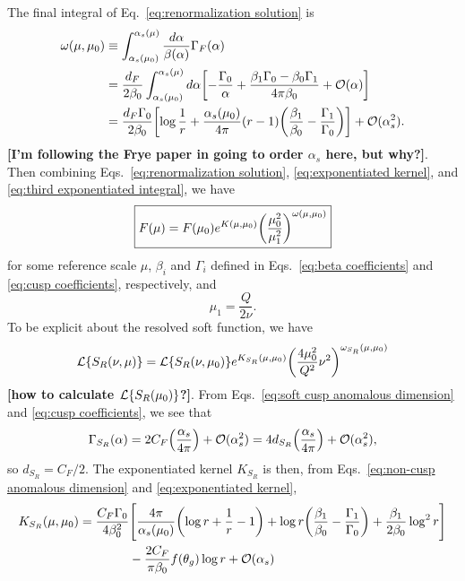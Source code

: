 \documentclass[11pt,twoside,reqno]{amsart}
\theoremstyle{plain}
\theoremstyle{remark}
\theoremstyle{definition}
\theoremstyle{remark}
\theoremstyle{definition}
\theoremstyle{definition}
\newcommand{\cL}{\mathcal{L}}
\newcommand{\cO}{\mathcal{O}}
\begin{document}
	The final integral of Eq.~\ref{eq:renormalization solution} is
	\begin{equation}\label{eq:third exponentiated integral}
	\begin{aligned}
		\omega(\mu, \mu_0) &\equiv \int_{\alpha_s(\mu_0)}^{\alpha_s(\mu)} \frac{d\alpha}{\beta(\alpha)}\Gamma_F(\alpha) \\
		&= \frac{d_F}{2\beta_0}\int_{\alpha_s(\mu_0)}^{\alpha_s(\mu)} d\alpha \qty[-\frac{\Gamma_0}{\alpha} + \frac{\beta_1\Gamma_0 - \beta_0 \Gamma_1}{4\pi \beta_0} + \cO(\alpha)] \\
		&= \frac{d_F \Gamma_0}{2\beta_0}\qty[\log \frac{1}{r} + \frac{\alpha_s(\mu_0)}{4\pi}(r - 1)\qty(\frac{\beta_1}{\beta_0} - \frac{\Gamma_1}{\Gamma_0})] + \cO(\alpha_s^2).
	\end{aligned}
	\end{equation}
	{\color{red}\textbf{[I'm following the Frye paper in going to order $\alpha_s$ here, but why?]}}. Then combining Eqs.~\ref{eq:renormalization solution}, \ref{eq:exponentiated kernel}, and \ref{eq:third exponentiated integral}, we have
	\begin{equation}
		\boxed{F(\mu) = F(\mu_0) e^{K(\mu, \mu_0)} \qty(\frac{\mu_0^2}{\mu_1^2})^{\omega(\mu, \mu_0)}}
	\end{equation}
	for some reference scale $\mu$, $\beta_i$ and $\Gamma_i$ defined in Eqs.~\ref{eq:beta coefficients} and \ref{eq:cusp coefficients}, respectively, and
	\begin{equation}
		\mu_1 = \frac{Q}{2\nu}.
	\end{equation}
	To be explicit about the resolved soft function, we have
	\begin{equation}\label{eq:resummed soft function laplace}
		\cL\qty{S_R(\nu, \mu)} = \cL\qty{S_R(\nu, \mu_0)} e^{K_{S_R}(\mu, \mu_0)} \qty(\frac{4 \mu_0^2}{Q^2}\nu^2)^{\omega_{S_R}(\mu, \mu_0)}
	\end{equation}
	{\color{red}\textbf{[how to calculate $\cL\qty{S_R(\mu_0)}$?]}}. From Eqs.~\ref{eq:soft cusp anomalous dimension} and \ref{eq:cusp coefficients}, we see that
	\begin{equation}
		\Gamma_{S_R}(\alpha) = 2C_F\qty(\frac{\alpha_s}{4\pi}) + \cO(\alpha_s^2) = 4d_{S_R} \qty(\frac{\alpha_s}{4\pi}) + \cO(\alpha_s^2),
	\end{equation}
	so $d_{S_R} = C_F/2$. The exponentiated kernel $K_{S_R}$ is then, from Eqs.~\ref{eq:non-cusp anomalous dimension} and \ref{eq:exponentiated kernel},
	\begin{equation}
	\begin{aligned}
		K_{S_R}(\mu, \mu_0) &= \frac{C_F\Gamma_0}{4\beta_0^2}\Bigg[\frac{4\pi}{\alpha_s(\mu_0)}\qty(\log r + \frac{1}{r} - 1) + \log r \qty(\frac{\beta_1}{\beta_0} - \frac{\Gamma_1}{\Gamma_0}) + \frac{\beta_1}{2\beta_0}\log^2 r \Bigg] \\
		&\qquad\qquad - \frac{2C_F}{\pi \beta_0}f(\theta_g)\log r + \cO(\alpha_s)
	\end{aligned}
	\end{equation}
\end{document}
